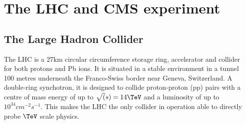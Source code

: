 
\chapter{The LHC and CMS experiment} %
\label{cha:detector}
\section{The Large Hadron Collider}
\label{lhc_intro}
The LHC is a 27km circular circumference storage ring, accelerator and collider for 
both protons and Pb ions. It is situated in a stable environment in a tunnel 
100 metres underneath the Franco-Swiss border near Geneva, Switzerland.
A double-ring synchotron, it is designed to collide proton-proton (pp)
pairs with a centre of mass energy of up to $\sqrt(s)=14\TeV$ and a 
luminosity of up to $10^{34}cm^{-2}s^{-1}$. This makes the LHC the only collider
in operation able to directly probe $\TeV$ scale physics. 

